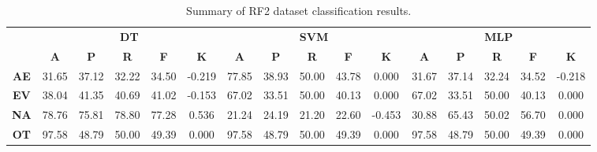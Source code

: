 \begin{landscape}
\begin{table}[htbp]
\footnotesize
\centering
\caption{Summary of RF2 dataset classification results.}
\label{tab:base_female}
\begin{tabular}{|c|c|c|c|c|c|c|c|c|c|c|c|c|c|c|c|}
\hline
\multirow{2}{*}{}	& \multicolumn{5}{c|}{\textbf{DT}}												& \multicolumn{5}{c|}{\textbf{SVM}}												& \multicolumn{5}{c|}{\textbf{MLP}}												\\ \cline{2-16} 
					& \textbf{A}	& \textbf{P}	& \textbf{R}	& \textbf{F}	& \textbf{K}	& \textbf{A}	& \textbf{P}	& \textbf{R}	& \textbf{F}	& \textbf{K}	& \textbf{A}	& \textbf{P}	& \textbf{R}	& \textbf{F}	& \textbf{K}	\\ \hline
\textbf{AE}			& 31.65			& 37.12			& 32.22			& 34.50			& -0.219			& 77.85			& 38.93			& 50.00			& 43.78			& 0.000			& 31.67			& 37.14			& 32.24			& 34.52			& -0.218			\\ \hline
\textbf{EV}			& 38.04			& 41.35			& 40.69			& 41.02			& -0.153			& 67.02			& 33.51			& 50.00			& 40.13			& 0.000			& 67.02			& 33.51			& 50.00			& 40.13			& 0.000			\\ \hline
\textbf{NA}			& 78.76			& 75.81			& 78.80			& 77.28			& 0.536			& 21.24			& 24.19			& 21.20			& 22.60			& -0.453			& 30.88			& 65.43			& 50.02			& 56.70			& 0.000			\\ \hline
\textbf{OT}			& 97.58			& 48.79			& 50.00			& 49.39			& 0.000			& 97.58			& 48.79			& 50.00			& 49.39			& 0.000			& 97.58			& 48.79			& 50.00			& 49.39			& 0.000			\\ \hline
\end{tabular}
\end{table}
\end{landscape}